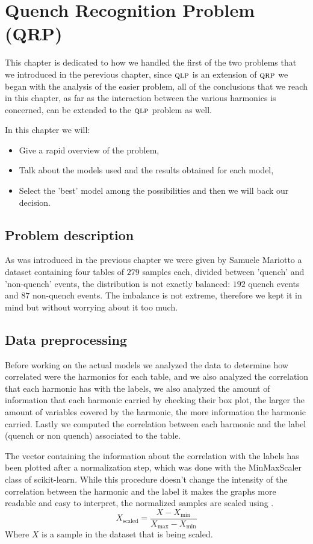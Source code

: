\chapter{Quench Recognition Problem (QRP)}
\label{chp:qrp}
This chapter is dedicated to how we handled the first of the two problems that we introduced in the
perevious chapter, since $\textsc{qlp}$ is an extension of $\textsc{qrp}$ we began with the analysis of the easier
problem, all of the conclusions that we reach in this chapter, as far as the interaction between the
various harmonics is concerned, can be extended to the $\textsc{qlp}$ problem as well.

In this chapter we will:
\begin{itemize}
	\item Give a rapid overview of the problem,
	\item Talk about the models used and the results obtained for each model,
	\item Select the 'best' model among the possibilities and then we will back our decision.
\end{itemize}

\section{Problem description}
As was introduced in the previous chapter we were given by Samuele Mariotto a dataset containing
four tables of $279$ samples each, divided between 'quench' and 'non-quench' events, the distribution is not exactly
balanced: $192$ quench events and $87$ non-quench events. The imbalance is not
extreme, therefore we kept it in mind but without worrying about it too much.

\section{Data preprocessing}
Before working on the actual models we analyzed the data to determine how correlated were the
harmonics for each table, and we also analyzed the correlation that each harmonic has with the
labels, we also analyzed the amount of information that each harmonic carried
by checking their box plot, the larger the amount of variables covered by the harmonic, the more
information the harmonic carried. Lastly we computed the correlation between each harmonic and the
label (quench or non quench) associated to the table.

The vector containing the information about the correlation with the labels has been plotted after a
normalization step, which was done with the MinMaxScaler class of scikit-learn. While this procedure
doesn't change the intensity of the correlation between the harmonic and the label it makes the
graphs more readable and easy to interpret, the normalized samples are scaled using
 \cite{Nishok2024}.
\begin{equation}
	\label{eq:normalization}
	X_\text{scaled} = \frac{X - X_\text{min}}{X_\text{max} - X_\text{min}}
\end{equation}
Where $X$ is a sample in the dataset that is being scaled.

